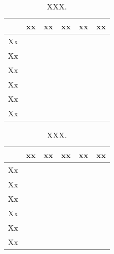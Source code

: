 \lipsum[20-23]

\begin{table}[hbp]
	\caption[XXX.]{XXX.}
	\label{tab:topic-in-chapter}
	\centering
	\begin{tabular}{l | c | c | c | c | c}
		\hline
		\quad & xx & xx & xx & xx\tablefootnote{Xxx.} & xx \\
		\hline
		Xx & \checkmark & & \checkmark & \checkmark &  \\
		\hline
		Xx & \checkmark & & \checkmark & &  \\
		\hline
		Xx & \checkmark & & \checkmark & & \checkmark \\
		\hline
		Xx & & \checkmark & \checkmark & &  \\
		\hline
		Xx & \checkmark & \checkmark & \checkmark & & \\
		\hline
		Xx & \checkmark & \checkmark & & \checkmark & \checkmark\\
		\hline
	\end{tabular}
\end{table}

\lipsum[24-26]

\begin{table}[hbp]
	\caption[XXX.]{XXX.}
	\label{tab:topic-in-chapter}
	\centering
	\begin{tabular}{l | c | c | c | c | c}
		\hline
		\quad & xx & xx & xx & xx\tablefootnote{Xxx.} & xx \\
		\hline
		Xx & \checkmark & & \checkmark & \checkmark &  \\
		\hline
		Xx & \checkmark & & \checkmark & &  \\
		\hline
		Xx & \checkmark & & \checkmark & & \checkmark \\
		\hline
		Xx & & \checkmark & \checkmark & &  \\
		\hline
		Xx & \checkmark & \checkmark & \checkmark & & \\
		\hline
		Xx & \checkmark & \checkmark & & \checkmark & \checkmark\\
		\hline
	\end{tabular}
\end{table}

\lipsum[27-28]




